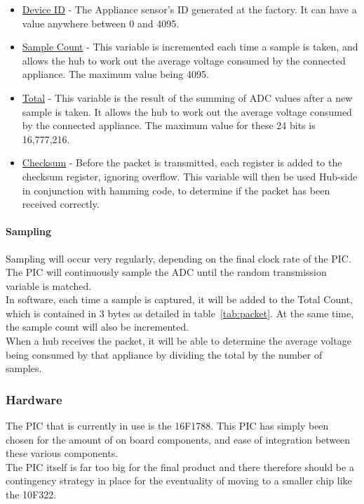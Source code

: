 \documentclass[draft,preprint,12pt,3p]{elsarticle}
\begin{document}
\begin{itemize}
\item \underline{Device ID} - The Appliance sensor's ID generated at the factory. It can have a value anywhere between 0 and 4095.
\item \underline{Sample Count} - This variable is incremented each time a sample is taken, and allows the hub to work out the average voltage consumed by the connected appliance. The maximum value being 4095.
\item \underline{Total} - This variable is the result of the summing of ADC values after a new sample is taken. It allows the hub to work out the average voltage consumed by the connected appliance. The maximum value for these 24 bits is 16,777,216.
\item \underline{Checksum} - Before the packet is transmitted, each register is added to the checksum register, ignoring overflow. This variable will then be used Hub-side in conjunction with hamming code, to determine if the packet has been received correctly.
\end{itemize}

\paragraph{Sampling}
Sampling will occur very regularly, depending on the final clock rate of the PIC.\\
The PIC will continuously sample the ADC until the random transmission variable is matched.\\
In software, each time a sample is captured, it will be added to the Total Count, which is contained in 3 bytes as detailed in table~\ref{tab:packet}. At the same time, the sample count will also be incremented. \\
When a hub receives the packet, it will be able to determine the average voltage being consumed by that appliance by dividing the total by the number of samples.

\subsubsection{Hardware}
The PIC that is currently in use is the 16F1788. This PIC has simply been chosen for the amount of on board components, and ease of integration between these various components.\\
The PIC itself is far too big for the final product and there therefore should be a contingency strategy in place for the eventuality of moving to a smaller chip like the 10F322.
\end{document}
